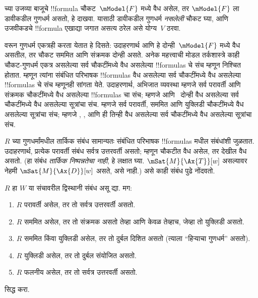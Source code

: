 \documentclass[../../../include/open-logic-section]{subfiles}
\begin{document}
\begin{prob}
 च्या उजव्या
बाजूचे !!{formula} चौकट~$\mModel{F}$ मध्ये वैध असेल,
तर $\mModel{F}$ ला डावीकडील गुणधर्म असतो, हे दाखवा.
यासाठी डावीकडील गुणधर्म \emph{नसलेली} चौकट घ्या,
आणि उजवीकडचे !!{formula} एखाद्या जगात असत्य ठरेल
असे योग्य~$V$ ठरवा.
\end{prob}

 वरून गुणधर्म एकत्रही
करता येतात हे दिसते: उदाहरणार्थ  आणि
 हे दोन्ही~$\mModel{F}$ मध्ये वैध असतील,
तर चौकट सममित आणि संक्रमक दोन्ही असते.
अनेक महत्त्वाची मोडल तर्कशास्त्रे काही चौकट-गुणधर्म
एकत्र असलेल्या सर्व चौकटींमध्ये वैध असलेल्या
!!{formula}s चे संच म्हणून निश्चित होतात. म्हणून
त्यांना संबंधित परिभाषक !!{formula}s वैध असलेल्या
सर्व चौकटींमध्ये वैध असलेल्या !!{formula}s चे संच
म्हणूनही सांगता येते. उदाहरणार्थ, अभिजात व्यवस्था
 म्हणजे सर्व परावर्ती आणि संक्रमक चौकटींमध्ये
वैध असलेल्या !!{formula}s चा संच; म्हणजे 
आणि~ दोन्ही वैध असलेल्या सर्व चौकटींमध्ये
वैध असलेल्या सूत्रांचा संच.
 म्हणजे सर्व परावर्ती, सममित आणि युक्लिडी
चौकटींमध्ये वैध असलेल्या सूत्रांचा संच; म्हणजे
, , आणि  ही तिन्ही वैध
असलेल्या सर्व चौकटींमध्ये वैध असलेल्या सूत्रांचा संच.

$R$ च्या गुणधर्मांमधील तार्किक संबंध सामान्यतः
संबंधित परिभाषक !!{formula}s मधील संबंधांशी जुळतात.
उदाहरणार्थ, प्रत्येक परावर्ती संबंध सर्वत्र उत्तरवर्ती
असतो; म्हणून चौकटीत  वैध असेल, तर
 देखील वैध असतो. (हा संबंध \emph{तार्किक
निष्पन्नतेचा नाही}, हे लक्षात घ्या. $\mSat{M}{\Ax{T}}[w]$
असल्यावर नेहमी $\mSat{M}{\Ax{D}}[w]$ असते, असे
नाही.) असे काही संबंध पुढे नोंदवतो.

\begin{prop}
  $R$ हा $W$ या संचावरील द्विस्थानी संबंध असू द्या. मग:
  \begin{enumerate}
  \item $R$ परावर्ती असेल, तर तो सर्वत्र उत्तरवर्ती असतो.
  \item $R$ सममित असेल, तर तो संक्रमक असतो तेव्हा आणि
    केवळ तेव्हाच, जेव्हा तो युक्लिडी असतो.
  \item $R$ सममित किंवा युक्लिडी असेल, तर तो दुर्बल
    दिशित असतो (त्याला ``हिऱ्याचा गुणधर्म'' असतो).
  \item $R$ युक्लिडी असेल, तर तो दुर्बल संयोजित असतो.
  \item $R$ फलनीय असेल, तर तो सर्वत्र उत्तरवर्ती असतो.
  \end{enumerate}
\end{prop}

\begin{prob}
   सिद्ध करा.
\end{prob}
\end{document}
